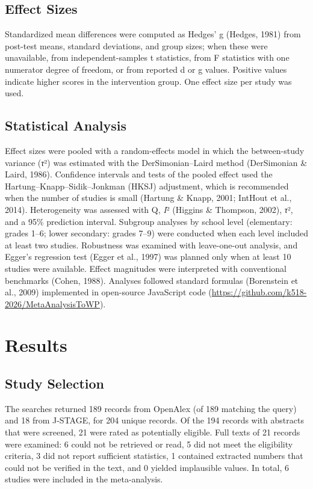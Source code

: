 \documentclass[man,a4paper,12pt,floatsintext,nolmodern,notab]{apa7}
\begin{document}
\subsection{Effect Sizes}
Standardized mean differences were computed as Hedges’ g (Hedges, 1981) from post-test means, standard deviations, and group sizes; when these were unavailable, from independent-samples t statistics, from F statistics with one numerator degree of freedom, or from reported d or g values. Positive values indicate higher scores in the intervention group. One effect size per study was used.

\subsection{Statistical Analysis}
Effect sizes were pooled with a random-effects model in which the between-study variance (\textit{τ}²) was estimated with the DerSimonian–Laird method (DerSimonian \& Laird, 1986). Confidence intervals and tests of the pooled effect used the Hartung–Knapp–Sidik–Jonkman (HKSJ) adjustment, which is recommended when the number of studies is small (Hartung \& Knapp, 2001; IntHout et al., 2014). Heterogeneity was assessed with Q, \textit{I}² (Higgins \& Thompson, 2002), \textit{τ}², and a 95\% prediction interval. Subgroup analyses by school level (elementary: grades 1–6; lower secondary: grades 7–9) were conducted when each level included at least two studies. Robustness was examined with leave-one-out analysis, and Egger’s regression test (Egger et al., 1997) was planned only when at least 10 studies were available. Effect magnitudes were interpreted with conventional benchmarks (Cohen, 1988). Analyses followed standard formulas (Borenstein et al., 2009) implemented in open-source JavaScript code (\url{https://github.com/k518-2026/MetaAnalysisToWP}).

\section{Results}
\subsection{Study Selection}
The searches returned 189 records from OpenAlex (of 189 matching the query) and 18 from J-STAGE, for 204 unique records. Of the 194 records with abstracts that were screened, 21 were rated as potentially eligible. Full texts of 21 records were examined: 6 could not be retrieved or read, 5 did not meet the eligibility criteria, 3 did not report sufficient statistics, 1 contained extracted numbers that could not be verified in the text, and 0 yielded implausible values. In total, 6 studies were included in the meta-analysis.
\end{document}
